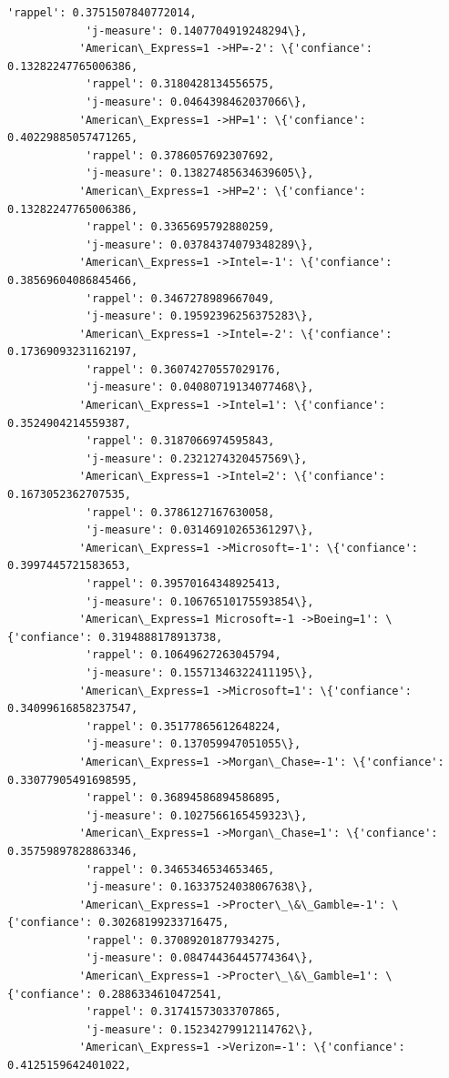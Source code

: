 \documentclass[11pt]{article}
\begin{document}
\begin{Verbatim}[commandchars=\\\{\}]
            'rappel': 0.3751507840772014,
            'j-measure': 0.1407704919248294\},
           'American\_Express=1 ->HP=-2': \{'confiance': 0.13282247765006386,
            'rappel': 0.3180428134556575,
            'j-measure': 0.0464398462037066\},
           'American\_Express=1 ->HP=1': \{'confiance': 0.40229885057471265,
            'rappel': 0.3786057692307692,
            'j-measure': 0.13827485634639605\},
           'American\_Express=1 ->HP=2': \{'confiance': 0.13282247765006386,
            'rappel': 0.3365695792880259,
            'j-measure': 0.03784374079348289\},
           'American\_Express=1 ->Intel=-1': \{'confiance': 0.38569604086845466,
            'rappel': 0.3467278989667049,
            'j-measure': 0.19592396256375283\},
           'American\_Express=1 ->Intel=-2': \{'confiance': 0.17369093231162197,
            'rappel': 0.36074270557029176,
            'j-measure': 0.04080719134077468\},
           'American\_Express=1 ->Intel=1': \{'confiance': 0.3524904214559387,
            'rappel': 0.3187066974595843,
            'j-measure': 0.2321274320457569\},
           'American\_Express=1 ->Intel=2': \{'confiance': 0.1673052362707535,
            'rappel': 0.3786127167630058,
            'j-measure': 0.03146910265361297\},
           'American\_Express=1 ->Microsoft=-1': \{'confiance': 0.3997445721583653,
            'rappel': 0.39570164348925413,
            'j-measure': 0.10676510175593854\},
           'American\_Express=1 Microsoft=-1 ->Boeing=1': \{'confiance': 0.3194888178913738,
            'rappel': 0.10649627263045794,
            'j-measure': 0.15571346322411195\},
           'American\_Express=1 ->Microsoft=1': \{'confiance': 0.34099616858237547,
            'rappel': 0.35177865612648224,
            'j-measure': 0.137059947051055\},
           'American\_Express=1 ->Morgan\_Chase=-1': \{'confiance': 0.33077905491698595,
            'rappel': 0.36894586894586895,
            'j-measure': 0.1027566165459323\},
           'American\_Express=1 ->Morgan\_Chase=1': \{'confiance': 0.35759897828863346,
            'rappel': 0.3465346534653465,
            'j-measure': 0.16337524038067638\},
           'American\_Express=1 ->Procter\_\&\_Gamble=-1': \{'confiance': 0.30268199233716475,
            'rappel': 0.37089201877934275,
            'j-measure': 0.08474436445774364\},
           'American\_Express=1 ->Procter\_\&\_Gamble=1': \{'confiance': 0.2886334610472541,
            'rappel': 0.31741573033707865,
            'j-measure': 0.15234279912114762\},
           'American\_Express=1 ->Verizon=-1': \{'confiance': 0.4125159642401022,

\end{Verbatim}
\end{document}
